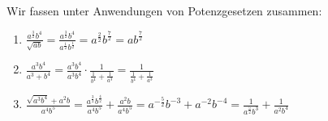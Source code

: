 \item Wir fassen unter Anwendungen von Potenzgesetzen zusammen:

\begin{enumerate}
\item $\frac{a^{\frac{3}{2}}b^4}{\sqrt{ab}} =  \frac{a^{\frac{3}{2}}b^4}{a^{\frac{1}{2}}b^{\frac{1}{2}}} =   a^{\frac{2}{2}}b^{\frac{7}{2}} = ab^{\frac{7}{2}} $\\
\item $\frac{a^3b^4}{a^3+b^4} = \frac{a^3b^4}{a^3b^4} \cdot \frac{1}{\frac{1}{b^4}+\frac{1}{a^3}}=\frac{1}{\frac{1}{b^4}+\frac{1}{a^3}}$\\
\item $\frac{\sqrt{a^3b^4}+a^2b}{a^4b^5}= \frac{a^{\frac{3}{2}}b^{\frac{4}{2}}}{a^4b^5} + \frac{a^2b}{a^4b^5} = a^{-\frac{5}{2}} b^{-3} + a^{-2}b^{-4} = \frac{1}{a^{\frac{5}{2}}{b^3}} + \frac{1}{a^2 b^4}$\\
\end{enumerate}

